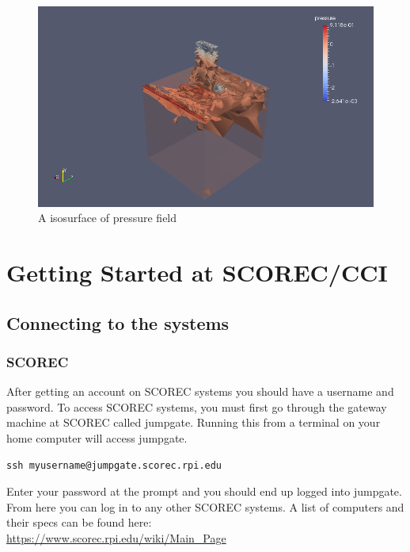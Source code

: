 \documentclass{article}
\begin{document}
\begin{figure}[h!]
\centering
\includegraphics[width=1\textwidth]{res2}
\caption{A isosurface of pressure field}
\label{fig:6}
\end{figure}

\pagebreak


\appendix


\section{Getting Started at SCOREC/CCI}
\label{ch:1}
\subsection{Connecting to the systems}
\label{ch:1.1}
\subsubsection{SCOREC}
After getting an account on SCOREC systems you should have a username and password. To access SCOREC systems, you must first go through the gateway machine at SCOREC called jumpgate. Running this from a terminal on your home computer will access jumpgate.
\begin{lstlisting}
ssh myusername@jumpgate.scorec.rpi.edu
\end{lstlisting}
Enter your password at the prompt and you should end up logged into jumpgate. From here you can log in to any other SCOREC systems. A list of computers and their specs can be found here:\\
\url{https://www.scorec.rpi.edu/wiki/Main_Page}
\end{document}
